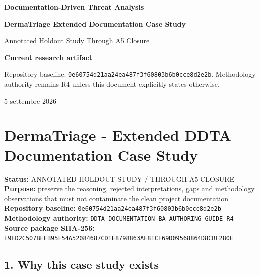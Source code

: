 \documentclass[11pt,a4paper]{article}
\begin{document}
\begin{titlepage}
\thispagestyle{empty}
\vspace*{10mm}
{\sffamily\bfseries\color{DDTANavy}\fontsize{15}{18}\selectfont Documentation-Driven Threat Analysis}\par
\vspace{5mm}
{\sffamily\bfseries\color{DDTANavy}\fontsize{27}{31}\selectfont DermaTriage Extended Documentation Case Study}\par
\vspace{2mm}
{\sffamily\color{DDTABlue}\fontsize{17}{21}\selectfont Annotated Holdout Study Through A5 Closure}\par
\vspace{10mm}
\begin{tcolorbox}[enhanced,arc=3pt,boxrule=0pt,colback=DDTANavy,left=12pt,right=12pt,top=10pt,bottom=10pt]
{\color{white}\sffamily\bfseries Current research artifact}\par
{\color{white!88}\small Repository baseline: \texttt{0e60754d21aa24ea487f3f60803b6b0cce8d2e2b}. Methodology authority remains R4 unless this document explicitly states otherwise.}
\end{tcolorbox}
\vfill
{\sffamily\small\color{DDTAGray} 5 settembre 2026}
\end{titlepage}
\tableofcontents
\clearpage
\section{DermaTriage - Extended DDTA Documentation Case
Study}\label{dermatriage---extended-ddta-documentation-case-study}

\textbf{Status:} ANNOTATED HOLDOUT STUDY / THROUGH A5 CLOSURE\\
\textbf{Purpose:} preserve the reasoning, rejected interpretations, gaps
and methodology observations that must not contaminate the clean project
documentation\\
\textbf{Repository baseline:}
\texttt{0e60754d21aa24ea487f3f60803b6b0cce8d2e2b}\\
\textbf{Methodology authority:}
\texttt{DDTA\_DOCUMENTATION\_BA\_AUTHORING\_GUIDE\_R4}\\
\textbf{Source package SHA-256:}
\texttt{E9ED2C507BEFB95F54A52084687CD1E8798863AE81CF69D09568864D8CBF280E}

\subsection{1. Why this case study
exists}\label{1-why-this-case-study-exists}
\end{document}
